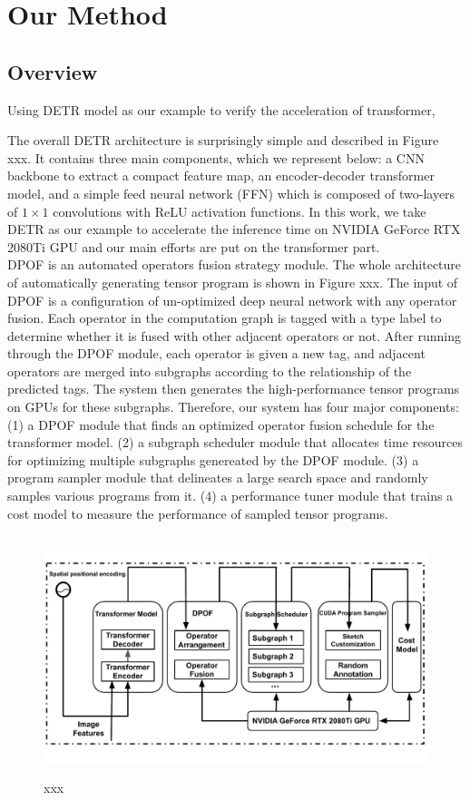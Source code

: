 \section{Our Method}

\subsection{Overview}

{\color{red} Using DETR model as our example to verify the acceleration of transformer, }

The overall DETR architecture is surprisingly simple and described in Figure xxx. It contains three main components, which we represent below:
a CNN backbone to extract a compact feature map, an encoder-decoder transformer model, and a simple feed neural network (FFN) which is composed
of two-layers of $1 \times 1$ convolutions with ReLU activation functions. In this work, we take DETR as our example to accelerate the inference
time on NVIDIA GeForce RTX 2080Ti GPU and our main efforts are put on the transformer part. \\

DPOF is an automated operators fusion strategy module. The whole architecture of automatically generating tensor program is shown in Figure xxx.
The input of DPOF is a configuration of un-optimized deep neural network with any operator fusion. Each operator in the computation graph is 
tagged with a type label to determine whether it is fused with other adjacent operators or not. After running through the DPOF module, each operator is given a new tag, and adjacent operators are merged into subgraphs according to the relationship of the predicted tags. The system
then generates the high-performance tensor programs on GPUs for these subgraphs. Therefore, our system has four major components: 
(1) a DPOF module that finds an optimized operator fusion schedule for the transformer model.
(2) a subgraph scheduler module that allocates time resources for optimizing multiple subgraphs genereated by the DPOF module.
(3) a program sampler module that delineates a large search space and randomly samples various programs from it.
(4) a performance tuner module that trains a cost model to measure the performance of sampled tensor programs.


\begin{figure}[htbp]
    \centering
    \includegraphics[height=7cm, width=18cm]{figs/fig3}
    \caption{xxx}
    \label{fig:fig3}
\end{figure}


